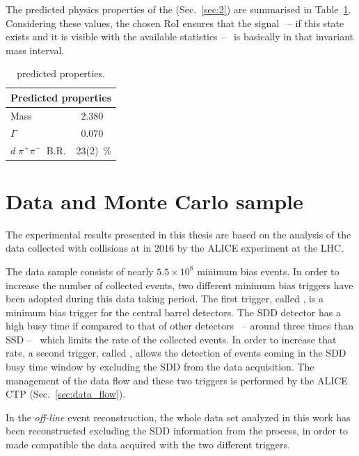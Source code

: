 The predicted physics properties of the \dst (Sec.~\ref{sec:2}) are summarised in Table~\ref{tab:dst_prop}. 
Considering these values, the chosen RoI ensures that the signal \ -- if this state exists and it is visible with the available statistics
-- \ is basically in that invariant mass interval.
\begingroup
\renewcommand{\arraystretch}{1.5} %
\begin{table}
\centering
\captionsetup{justification=centering}
\begin{tabular}{lr}
\multicolumn{2}{c}{\textbf{Predicted properties}}      \\
\toprule
Mass				                   & 2.380 \ \gevcs   \\
$\Gamma$			        	       & 0.070 \ \gevcs   \\
$d\; \pi^{+} \pi^{-}\ $ B.R.	 & 23(2)\ \%		    \\
\midrule
\end{tabular}
\caption{\dst predicted properties.}
\label{tab:dst_prop}
\end{table}
\endgroup

%
%
\section{Data and Monte Carlo sample} \label{sec:4.2}

The experimental results presented in this thesis are based on the analysis of the data collected with \pPb collisions at \sctev in 2016 by the ALICE experiment at the LHC. 

The data sample  consists of nearly $5.5\times10^{8}$ minimum bias events.
In order to increase the number of collected events, two
different minimum bias triggers have been adopted during this data taking period.
The first trigger, called , is a minimum bias trigger for the central barrel
detectors. The SDD detector has a high busy time if compared to that of other detectors \ -- around three times
than SSD -- \ which limits the rate of the collected events. 
In order to increase that rate, a second trigger, called , allows the detection of events coming in the SDD busy time window by excluding the SDD from the data acquisition.
The management of the data flow and these two triggers is performed by the ALICE 
CTP (Sec.~\ref{sec:data_flow}).

In the \textit{off-line} event reconstruction, the whole data set analyzed in this work has been
reconstructed excluding the SDD information from the process, in order to made compatible
the data acquired with the two different triggers.

